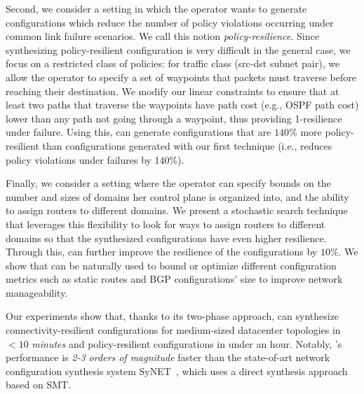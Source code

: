 Second, we consider a setting in which the operator wants to generate
configurations which reduce the number of policy violations occurring
under common link failure scenarios. We call this notion \emph{policy-resilience}.
Since synthesizing policy-resilient configuration is very difficult in
the general case, we focus on a {\rm restricted class} of policies:
for traffic class (src-dst subnet pair), we allow the operator to
specify a set of waypoints that packets must traverse before reaching
their destination.  We modify our linear constraints to ensure that
at least two paths that traverse the waypoints have path cost (e.g.,
OSPF path cost) lower than any path not going through a waypoint, thus
providing 1-resilience under failure. Using this, \name can generate
configurations that are $140\%$ more policy-resilient than
configurations generated with our first technique (i.e., reduces
policy violations under failures by 140\%).

Finally, we consider a setting where the operator can specify bounds
on the number and sizes of domains her control plane is organized
into, and the ability to assign routers to different domains.  We
present a stochastic search technique that leverages this flexibility
to look for ways to assign routers to different domains so that the
synthesized configurations have even higher resilience.  Through this,
\name can further improve the resilience of the configurations by
$10\%$. We show that \name can be naturally used to bound or optimize
different configuration metrics such as static routes and BGP
configurations' size to improve network manageability.

Our experiments show that, thanks to its two-phase approach, \name can
synthesize connectivity-resilient configurations for medium-sized
datacenter topologies in $< 10$ {\em minutes} and policy-resilient configurations
in under an hour.  Notably, \name's performance is {\em 2-3 orders of
  magnitude} faster than the state-of-art network configuration
synthesis system SyNET~\cite{synet}, which uses a direct synthesis
approach based on SMT.


